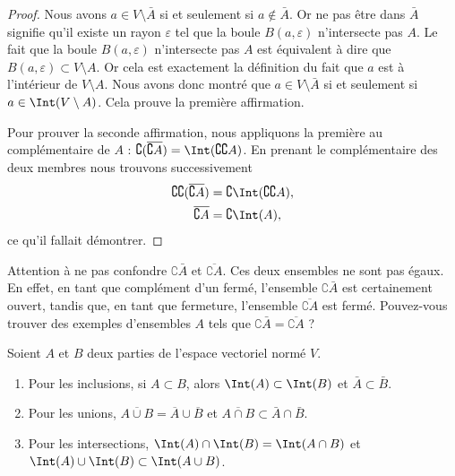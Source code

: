\begin{proof}
	Nous avons $a\in V\setminus\bar A$ si et seulement si $a\notin\bar A$. Or ne pas être dans $\bar A$ signifie qu'il existe un rayon $\varepsilon$ tel que la boule $B(a,\varepsilon)$ n'intersecte pas $A$. Le fait que la boule $B(a,\varepsilon)$ n'intersecte pas $A$ est équivalent à dire que $B(a,\varepsilon)\subset V\setminus A$. Or cela est exactement la définition du fait que $a$ est à l'intérieur de $V\setminus A$. Nous avons donc montré que $a\in V\setminus \bar A$ si et seulement si $a\in\Int(V\setminus A)$. Cela prouve la première affirmation.

	Pour prouver la seconde affirmation, nous appliquons la première au complémentaire de $A$ : $\complement(\overline{ \complement A })=\Int(\complement\complement A)$. En prenant le complémentaire des deux membres nous trouvons successivement
	\begin{equation}
		\begin{aligned}[]
			\complement\complement(\overline{ \complement A }) & =\complement\Int(\complement\complement A), \\
			\overline{ \complement A }                         & =\complement\Int(A),
		\end{aligned}
	\end{equation}
	ce qu'il fallait démontrer.
\end{proof}

Attention à ne pas confondre $\complement \bar A$ et $\overline{ \complement A }$. Ces deux ensembles ne sont pas égaux. En effet, en tant que complément d'un fermé, l'ensemble $\complement \bar A$ est certainement ouvert, tandis que, en tant que fermeture, l'ensemble $\overline{ \complement A }$ est fermé. Pouvez-vous trouver des exemples d'ensembles $A$ tels que $\complement \bar A=\overline{ \complement A }$ ?

\begin{proposition}
	Soient $A$ et $B$ deux parties de l'espace vectoriel normé $V$.
	\begin{enumerate}
		\item
		      Pour les inclusions, si $A\subset B$, alors $\Int(A)\subset\Int(B)$ et $\bar A\subset\bar B$.
		\item
		      Pour les unions, $\overline{ A\cup B }=\overline{ A }\cup\overline{ B }$ et $\overline{ A\cap B }\subset\bar A\cap\bar B$.
		\item
		      Pour les intersections, $\Int(A)\cap\Int(B)=\Int(A\cap B)$ et $\Int(A)\cup\Int(B)\subset\Int(A\cup B)$.
	\end{enumerate}
\end{proposition}

